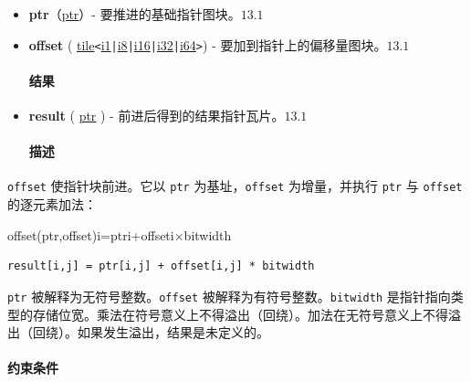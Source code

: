 \documentclass{article}
\begin{document}
\begin{itemize}
\item \textbf{ptr}（\href{https://docs.nvidia.com/cuda/tile-ir/latest/sections/types.html#type-ptr}{ptr}）- 要推进的基础指针图块。$\boxed{13.1}$
\item \textbf{offset} ( \href{https://docs.nvidia.com/cuda/tile-ir/latest/sections/types.html#type-tile}{tile}\texttt{<}\href{https://docs.nvidia.com/cuda/tile-ir/latest/sections/types.html#subsection-element-types}{i1}\texttt{|}\href{https://docs.nvidia.com/cuda/tile-ir/latest/sections/types.html#subsection-element-types}{i8}\texttt{|}\href{https://docs.nvidia.com/cuda/tile-ir/latest/sections/types.html#subsection-element-types}{i16}\texttt{|}\href{https://docs.nvidia.com/cuda/tile-ir/latest/sections/types.html#subsection-element-types}{i32}\texttt{|}\href{https://docs.nvidia.com/cuda/tile-ir/latest/sections/types.html#subsection-element-types}{i64}\texttt{>}) - 要加到指针上的偏移量图块。$\boxed{13.1}$


\paragraph{结果}

\item \textbf{result} ( \href{https://docs.nvidia.com/cuda/tile-ir/latest/sections/types.html#type-ptr}{ptr} ) - 前进后得到的结果指针瓦片。$\boxed{13.1}$


\paragraph{描述}

\end{itemize}
\texttt{offset} 使指针块前进。它以 \texttt{ptr} 为基址，\texttt{offset} 为增量，并执行 \texttt{ptr} 与 \texttt{offset} 的逐元素加法：


offset(ptr,offset)i=ptri+offseti×bitwidth

\begin{lstlisting}
result[i,j] = ptr[i,j] + offset[i,j] * bitwidth
\end{lstlisting}

\texttt{ptr} 被解释为无符号整数。\texttt{offset} 被解释为有符号整数。\texttt{bitwidth} 是指针指向类型的存储位宽。乘法在符号意义上不得溢出（回绕）。加法在无符号意义上不得溢出（回绕）。如果发生溢出，结果是未定义的。



\paragraph{约束条件}
\end{document}
